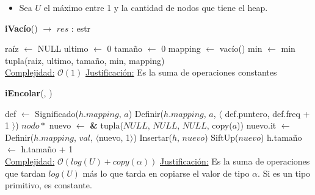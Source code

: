 \begin{Algoritmos}
    \begin{itemize}
        \item Sea $U$ el máximo entre 1 y la cantidad de nodos que tiene el heap.
    \end{itemize}
    
    \begin{algorithm}
    \caption{\textbf{iVacío}() $\to$ $res$ : estr}
    \begin{algorithmic}
        \State raíz $\gets$ NULL  
        \State ultimo $\gets$ 0  
        \State tamaño $\gets$ 0  
        \State mapping $\gets$ vacío()  
        \State min $\gets$ min  
        \State \Return tupla(raiz, ultimo, tamaño, min, mapping)
        \\
        \Statex \underline{Complejidad:} $\mathcal{O}(1)$
        \Statex \underline{Justificación:} Es la suma de operaciones constantes
    \end{algorithmic}
    \end{algorithm}

    \begin{algorithm}
    \caption{\textbf{iEncolar}(, )}
    \begin{algorithmic}
          
            \State def $\gets$ Significado($h.mapping$, $a$)  
            \State Definir($h.mapping$, $a$, $\langle$ def.puntero, def.freq + 1 $\rangle$)  
        \Else
            \State $nodo*$ nuevo $\gets$ \textbf{\&} tupla($NULL$, $NULL$, $NULL$, copy($a$))  
            \State nuevo.it $\gets$ Definir($h.mapping$, $val$, $\langle$nuevo, 1$\rangle$)  
            \State Insertar($h$, $nuevo$)  
            \State SiftUp($nuevo$)  
        \EndIf
        \State h.tamaño $\gets$ h.tamaño + 1  
        \\
        \Statex \underline{Complejidad:} $\mathcal{O}(log(U) + copy(\alpha))$
        \Statex \underline{Justificación:} Es la suma de operaciones que tardan $log(U)$ más lo que tarda en copiarse el valor de tipo $\alpha$. Si es un tipo primitivo, es constante.
    \end{algorithmic}
    \end{algorithm}


\end{Algoritmos}
